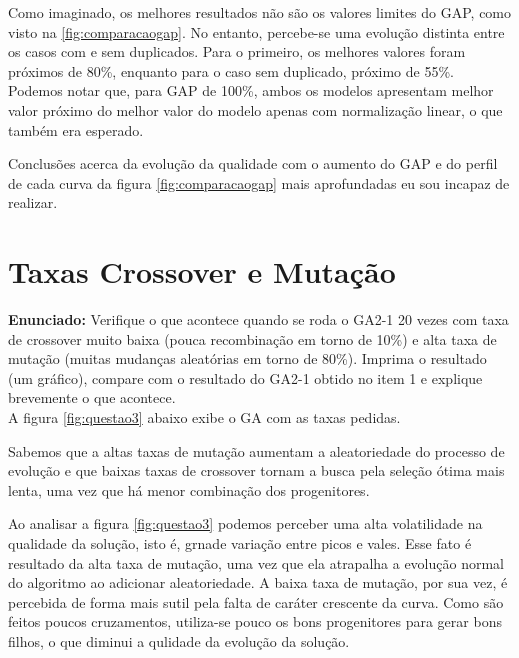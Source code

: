 \documentclass[12pt]{article}
\begin{document}
Como imaginado, os melhores resultados não são os valores limites do GAP, como visto na \ref{fig:comparacaogap}. No entanto, percebe-se uma evolução distinta entre os casos com e sem duplicados. Para o primeiro, os melhores valores foram próximos de 80\%, enquanto para o caso sem duplicado, próximo de 55\%. Podemos notar que, para GAP de 100\%, ambos os modelos apresentam melhor valor próximo do melhor valor do modelo apenas com normalização linear, o que também era esperado.

Conclusões acerca da evolução da qualidade com o aumento do GAP e do perfil de cada curva da figura \ref{fig:comparacaogap} mais aprofundadas eu sou incapaz de realizar.
	
\section{Taxas Crossover e Mutação}
\textbf{Enunciado:}
Verifique o que acontece quando se roda o GA2-1 20 vezes com taxa de crossover muito baixa (pouca recombinação em torno de 10\%) e alta taxa de mutação (muitas mudanças aleatórias em torno de 80\%). Imprima o resultado (um gráfico), compare com o resultado do GA2-1 obtido no item 1 e explique
brevemente o que acontece.\\

A figura \ref{fig:questao3} abaixo exibe o GA com as taxas pedidas.

Sabemos que a altas taxas de mutação aumentam a aleatoriedade do processo de evolução e que baixas taxas de crossover tornam a busca pela seleção ótima mais lenta, uma vez que há menor combinação dos progenitores.

Ao analisar a figura \ref{fig:questao3} podemos perceber uma alta volatilidade na qualidade da solução, isto é, grnade variação entre picos e vales. Esse fato é resultado da alta taxa de mutação, uma vez que ela atrapalha a evolução normal do algoritmo ao adicionar aleatoriedade. A baixa taxa de mutação, por sua vez, é percebida de forma mais sutil pela falta de caráter crescente da curva. Como são feitos poucos cruzamentos, utiliza-se pouco os bons progenitores para gerar bons filhos, o que diminui a qulidade da evolução da solução. 
\end{document}
